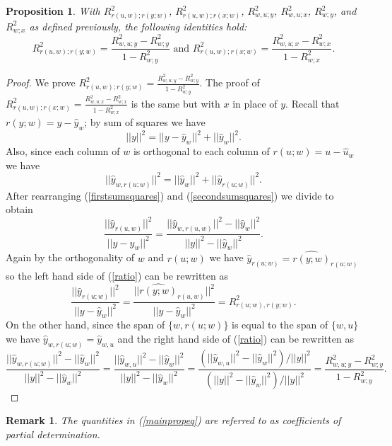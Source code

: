 \documentclass[11pt]{amsart}
\newtheorem{proposition}[theorem]{Proposition}
\newtheorem{remark}[theorem]{Remark}
\begin{document}
\begin{proposition}
\label{mainprop}
With $R^2_{r(u,w);r(y;w)}$, $R^2_{r(u,w);r(x;w)}$, $R^2_{w,u;y}$, $R^2_{w,u;x}$, $R^2_{w;y}$, and $R^2_{w;x}$ as defined previously, the following identities hold: 
\begin{equation}\label{mainpropeq}R^2_{r(u,w);r(y;w)}=\frac{R^2_{w,u;y}-R^2_{w;y}}{1-R^2_{w;y}}\textrm{~and~}R^2_{r(u,w);r(x;w)}=\frac{R^2_{w,u;x}-R^2_{w;x}}{1-R^2_{w;x}}.\end{equation}
\end{proposition}
\begin{proof}
We prove $R^2_{r(u,w);r(y;w)}=\frac{R^2_{w,u;y}-R^2_{w;y}}{1-R^2_{w;y}}$. The proof of $R^2_{r(u,w);r(x;w)}=\frac{R^2_{w,u;x}-R^2_{w;x}}{1-R^2_{w;x}}$ is the same but with $x$ in place of $y$. Recall that $r(y;w)=y-\hat{y}_w$; by sum of squares we have
\begin{equation}
\label{firstsumsquares}
||y||^2=||y-\hat{y}_w||^2+||\hat{y}_w||^2.
\end{equation}
Also, since each column of $w$ is orthogonal to each column of $r(u;w)=u-\hat{u}_w$ we have
\begin{equation}
\label{secondsumsquares}
||\hat{y}_{w,r(u;w)}||^2=||\hat{y}_w||^2+||\hat{y}_{r(u;w)}||^2.
\end{equation}
After rearranging (\ref{firstsumsquares}) and (\ref{secondsumsquares}) we divide to obtain
\begin{equation}
\label{ratio}
\frac{||\hat{y}_{r(u,w)}||^2}{||y-\hat{y}_w||^2}=\frac{||\hat{y}_{w,r(u,w)}||^2-||\hat{y}_w||^2}{||y||^2-||\hat{y}_w||^2}.
\end{equation}
Again by the orthogonality of $w$ and $r(u;w)$ we have $\hat{y}_{r(u;w)}=\hat{r(y;w)}_{r(u;w)}$ so the left hand side of (\ref{ratio}) can be rewritten as
\begin{equation}
\label{rephrased}
\frac{||\hat{y}_{r(u;w)}||^2}{||y-\hat{y}_w||^2}=\frac{||\hat{r(y;w)}_{r(u,w)}||^2}{||y-\hat{y}_w||^2}=R^2_{r(u;w),r(y;w)}.
\end{equation} 
On the other hand, since the span of $\{w,r(u;w)\}$ is equal to the span of $\{w,u\}$ we have $\hat{y}_{w,r(u;w)}=\hat{y}_{w,u}$ and the right hand side of (\ref{ratio}) can be rewritten as
\begin{equation}
\label{conclusion}
\frac{||\hat{y}_{w,r(u;w)}||^2-||\hat{y}_w||^2}{||y||^2-||\hat{y}_w||^2}=\frac{||\hat{y}_{w,u}||^2-||\hat{y}_w||^2}{||y||^2-||\hat{y}_w||^2}=\frac{(||\hat{y}_{w,u}||^2-||\hat{y}_w||^2)/||y||^2}{(||y||^2-||\hat{y}_w||^2)/||y||^2}=\frac{R^2_{w,u;y}-R^2_{w;y}}{1-R^2_{w;y}}.
\end{equation}
\end{proof}
\begin{remark}
    \label{partialR2}
    The quantities in (\ref{mainpropeq}) are referred to as coefficients of partial determination.
\end{remark}
\end{document}

